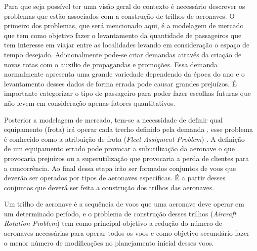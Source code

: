 Para que seja possível ter uma visão geral do contexto é necessário descrever os
problemas que estão associados com a construção de trilhos de aeronaves. O
primeiro dos problemas, que será mencionado aqui, é a modelagem de mercado que
tem como objetivo fazer o levantamento da quantidade de passageiros que tem
interesse em viajar entre as localidades levando em consideração o espaço de
tempo desejado. Adicionalmente pode-se criar demandas através da criação de
novas rotas com o auxilio de propagandas e promoções. Essa demanda normalmente
apresenta uma grande variedade dependendo da época do ano e o levantamento
desses dados de forma errada pode causar grandes prejuízos. É importante
categorizar o tipo de passageiro para poder fazer escolhas futuras que não
levem em consideração apenas fatores quantitativos.

Posterior a modelagem de mercado, tem-se a necessidade de definir qual
equipamento (frota) irá operar cada trecho definido pela
demanda \cite{pimentel2005}, esse problema é conhecido como a atribuição de
frota (\textit{Fleet Assigment Problem}) . A definição de um equipamento errado
pode provocar a subutilização da aeronave o que provocaria prejuízos ou a
superutilização que provocaria a perda de clientes para a
concorrência. Ao final dessa etapa irão ser formados
conjuntos de voos que deverão ser operados por tipos de aeronaves específicas.
É a partir desses conjuntos que deverá ser feita a construção dos trilhos das
aeronaves.

Um trilho de aeronave é a sequência de voos que uma aeronave deve operar em um
determinado período, e o problema de construção desses trilhos 
(\textit{Aircraft Rotation Problem}) tem como principal objetivo a
redução do número de aeronaves necessárias para operar todos os voos e como
objetivo secundário fazer o menor número de modificações no planejamento inicial desses
voos.

